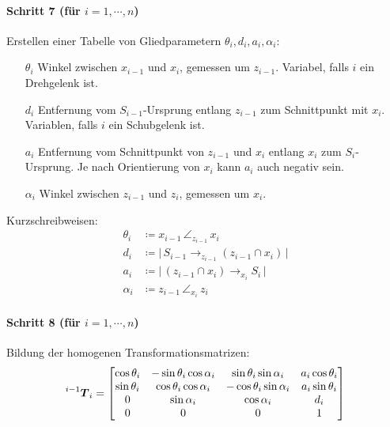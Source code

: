 \documentclass[a4paper, 11pt, accentcolor = tud3b]{tudreport}
\newcommand{\inreferenceto}[2]{\prescript{#1}{}{#2}}
\newcommand{\mat}[1]{\boldsymbol{#1}}
\begin{document}
					\paragraph{Schritt 7 (für \( i = 1, \cdots, n \))}
						Erstellen einer Tabelle von Gliedparametern \( \theta_i, d_i, a_i, \alpha_i \):
						\begin{itemize}
							\item[\(\theta_i\)] Winkel zwischen \(x_{i - 1}\) und \(x_i\), gemessen um \(z_{i - 1}\). Variabel, falls \(i\) ein Drehgelenk ist.
							\item[\(d_i\)] Entfernung vom \(S_{i - 1}\)-Ursprung entlang \(z_{i - 1}\) zum Schnittpunkt mit \(x_i\). Variablen, falls \(i\) ein Schubgelenk ist.
							\item[\(a_i\)] Entfernung vom Schnittpunkt von \(z_{i - 1}\) und \(x_i\) entlang \(x_i\) zum \(S_i\)-Ursprung. Je nach Orientierung von \(x_i\) kann \(a_i\) auch negativ sein.
							\item[\(\alpha_i\)] Winkel zwischen \( z_{i - 1} \) und \(z_i\), gemessen um \(x_i\).
						\end{itemize}
					
						Kurzschreibweisen:
						\begin{align*}
							\theta_i & \coloneqq x_{i - 1} \,\angle_{z_{i - 1}}\, x_i                                     \\
							d_i      & \coloneqq \big\lvert\, S_{i - 1} \to_{z_{i - 1}} (z_{i - 1} \cap x_i) \,\big\rvert \\
							a_i      & \coloneqq \big\lvert\, (z_{i - 1} \cap x_i) \to_{x_i} S_i \,\big\rvert                   \\
							\alpha_i & \coloneqq z_{i - 1} \,\angle_{x_i}\, z_i
						\end{align*}
					
					\paragraph{Schritt 8 (für \( i = 1, \cdots, n \))}
						Bildung der homogenen Transformationsmatrizen:
						\begin{equation*}
							\inreferenceto{i - 1}{\mat{T}}_i =
								\begin{bmatrix}
									\cos\theta_i & -\sin\theta_i \cos\alpha_i & \sin\theta_i \sin\alpha_i  & a_i \cos\theta_i \\
									\sin\theta_i & \cos\theta_i \cos\alpha_i  & -\cos\theta_i \sin\alpha_i & a_i \sin\theta_i \\
									0            & \sin\alpha_i               & \cos\alpha_i               & d_i              \\
									0            & 0                          & 0                          & 1
								\end{bmatrix}
						\end{equation*}
					
\end{document}

